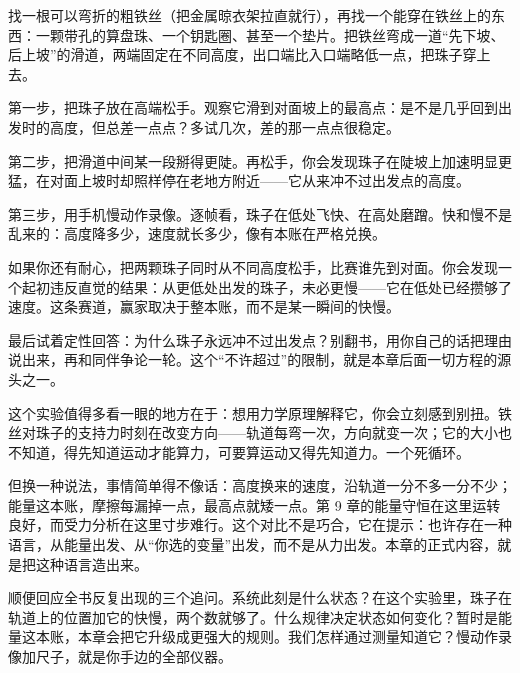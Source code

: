 
\begin{experiment}[衣架轨道与珠子]
找一根可以弯折的粗铁丝（把金属晾衣架拉直就行），再找一个能穿在铁丝上的东西：一颗带孔的算盘珠、一个钥匙圈、甚至一个垫片。把铁丝弯成一道“先下坡、后上坡”的滑道，两端固定在不同高度，出口端比入口端略低一点，把珠子穿上去。

第一步，把珠子放在高端松手。观察它滑到对面坡上的最高点：是不是几乎回到出发时的高度，但总差一点点？多试几次，差的那一点点很稳定。

第二步，把滑道中间某一段掰得更陡。再松手，你会发现珠子在陡坡上加速明显更猛，在对面上坡时却照样停在老地方附近——它从来冲不过出发点的高度。

第三步，用手机慢动作录像。逐帧看，珠子在低处飞快、在高处磨蹭。快和慢不是乱来的：高度降多少，速度就长多少，像有本账在严格兑换。

如果你还有耐心，把两颗珠子同时从不同高度松手，比赛谁先到对面。你会发现一个起初违反直觉的结果：从更低处出发的珠子，未必更慢——它在低处已经攒够了速度。这条赛道，赢家取决于整本账，而不是某一瞬间的快慢。

最后试着定性回答：为什么珠子永远冲不过出发点？别翻书，用你自己的话把理由说出来，再和同伴争论一轮。这个“不许超过”的限制，就是本章后面一切方程的源头之一。
\end{experiment}

\begin{mainline}
这个实验值得多看一眼的地方在于：想用力学原理解释它，你会立刻感到别扭。铁丝对珠子的支持力时刻在改变方向——轨道每弯一次，方向就变一次；它的大小也不知道，得先知道运动才能算力，可要算运动又得先知道力。一个死循环。

但换一种说法，事情简单得不像话：高度换来的速度，沿轨道一分不多一分不少；能量这本账，摩擦每漏掉一点，最高点就矮一点。第 9 章的能量守恒在这里运转良好，而受力分析在这里寸步难行。这个对比不是巧合，它在提示：也许存在一种语言，从能量出发、从“你选的变量”出发，而不是从力出发。本章的正式内容，就是把这种语言造出来。

顺便回应全书反复出现的三个追问。系统此刻是什么状态？在这个实验里，珠子在轨道上的位置加它的快慢，两个数就够了。什么规律决定状态如何变化？暂时是能量这本账，本章会把它升级成更强大的规则。我们怎样通过测量知道它？慢动作录像加尺子，就是你手边的全部仪器。
\end{mainline}


